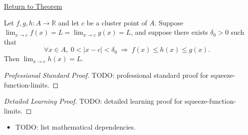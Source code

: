 \newpage
{}
\label{prf:squeeze-function-limits}

\begin{remark*}[Return]
\hyperref[thm:squeeze-function-limits]{Return to Theorem}
\end{remark*}

\begin{theorem*}
Let $f, g, h : A \to \mathbb{R}$ and let $c$ be a cluster point of
$A$. Suppose $\lim_{x\to c}f(x)=L =
\lim_{x\to c}g(x)=L$, and suppose there exists
$\delta_0 > 0$ such that
\[
  \forall x \in A,\;
  0 < |x - c| < \delta_0
  \;\Rightarrow\;
  f(x) \leq h(x) \leq g(x).
\]
Then $\lim_{x\to c}h(x)=L$.

\smallskip\noindent
\end{theorem*}

\begin{proof}[Professional Standard Proof]
\LRAProofBodyStart
TODO: professional standard proof for squeeze-function-limits.
\end{proof}

\begin{proof}[Detailed Learning Proof]
\LRAProofBodyStart
TODO: detailed learning proof for squeeze-function-limits.
\end{proof}

\begin{remark*}
\end{remark*}

\begin{dependencies}
\begin{itemize}
  \item TODO: list mathematical dependencies.
\end{itemize}
\end{dependencies}

\clearpage
